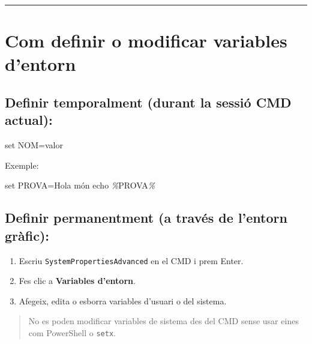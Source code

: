 \documentclass[
  a4paper,
]{article}
\newenvironment{Shaded}{\begin{snugshade}}{\end{snugshade}}
\newcommand{\BuiltInTok}[1]{#1}
\newcommand{\NormalTok}[1]{#1}
\newcommand{\PreprocessorTok}[1]{\textcolor[rgb]{0.56,0.35,0.01}{\textit{#1}}}
\newcommand{\VariableTok}[1]{\textcolor[rgb]{0.00,0.00,0.00}{#1}}
\providecommand{\tightlist}{%
  \setlength{\itemsep}{0pt}\setlength{\parskip}{0pt}}
\begin{document}
\begin{center}\rule{0.5\linewidth}{0.5pt}\end{center}

\section{Com definir o modificar variables
d'entorn}\label{com-definir-o-modificar-variables-dentorn}

\subsection{Definir temporalment (durant la sessió CMD
actual):}\label{definir-temporalment-durant-la-sessiuxf3-cmd-actual}

\begin{Shaded}
\begin{Highlighting}[]
\BuiltInTok{set} \VariableTok{NOM}\NormalTok{=valor}
\end{Highlighting}
\end{Shaded}

Exemple:

\begin{Shaded}
\begin{Highlighting}[]
\BuiltInTok{set} \VariableTok{PROVA}\NormalTok{=Hola món}
\BuiltInTok{echo} \PreprocessorTok{\%}\VariableTok{PROVA}\PreprocessorTok{\%}
\end{Highlighting}
\end{Shaded}

\subsection{Definir permanentment (a través de l'entorn
gràfic):}\label{definir-permanentment-a-travuxe9s-de-lentorn-gruxe0fic}

\begin{enumerate}
\def\labelenumi{\arabic{enumi}.}
\tightlist
\item
  Escriu \texttt{SystemPropertiesAdvanced} en el CMD i prem Enter.
\item
  Fes clic a \textbf{Variables d'entorn}.
\item
  Afegeix, edita o esborra variables d'usuari o del sistema.
\end{enumerate}

\begin{quote}
No es poden modificar variables de sistema des del CMD sense usar eines
com PowerShell o \texttt{setx}.
\end{quote}
\end{document}
